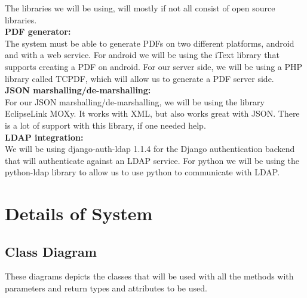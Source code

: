 \documentclass[12pt]{article}
\begin{document}
		The libraries we will be using, will mostly if not all consist of open source libraries.
		\\\linebreak
		\textbf{PDF generator:}
		\\\linebreak
		The system must be able to generate PDFs on two different platforms, android and with a web service. 		For android we will be using the iText library that supports creating a PDF on android. For our server 	side, we will be using a PHP library called TCPDF, which will allow us to generate a PDF server side.
		\\\linebreak
		\textbf{JSON marshalling/de-marshalling:}
		\\\linebreak
		For our JSON marshalling/de-marshalling, we will be using the library EclipseLink MOXy. It works with 		XML, but also works great with JSON. There is a lot of support with this library, if one needed help.
		\\\linebreak
		\textbf{LDAP integration:}
		\\\linebreak
		We will be using django-auth-ldap 1.1.4 for the Django authentication backend that will authenticate 		against an LDAP service. For python we will be using the python-ldap library to allow us to use python 	to communicate with LDAP.

		\vspace{0.5cm}

\newpage
\section{Details of System}
	\vspace{0.5cm}
	
	\subsection{Class Diagram}
	\vspace{0.5cm}
	
	These diagrams depicts the classes that will be used with all the methods with parameters and return types and attributes to be used.
	
\end{document}
